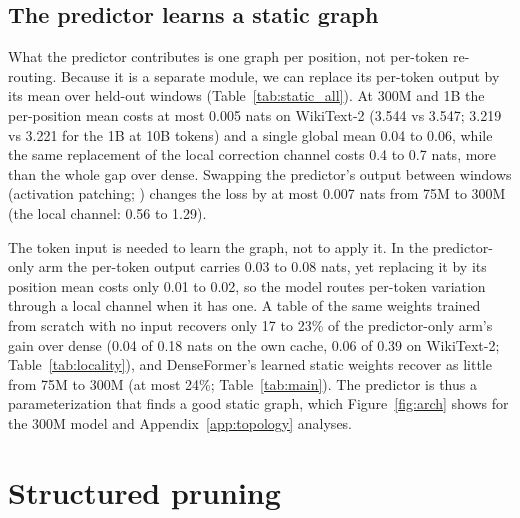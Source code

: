 \documentclass[11pt]{article}
\newcommand{\pend}{\textcolor{black!45}{\textit{run.}}}
\begin{document}
\subsection{The predictor learns a static graph}
\label{sec:static}

What the predictor contributes is one graph per position, not per-token re-routing. Because it is a separate module, we can replace its per-token output by its mean over held-out windows (Table~\ref{tab:static_all}). At 300M and 1B the per-position mean costs at most 0.005 nats on WikiText-2 (3.544 vs 3.547; 3.219 vs 3.221 for the 1B at 10B tokens) and a single global mean 0.04 to 0.06, while the same replacement of the local correction channel costs 0.4 to 0.7 nats, more than the whole gap over dense. Swapping the predictor's output between windows (activation patching; \citealp{vig2020causal,meng2022rome,zhang2024patching}) changes the loss by at most 0.007 nats from 75M to 300M (the local channel: 0.56 to 1.29).

The token input is needed to learn the graph, not to apply it. In the predictor-only arm the per-token output carries 0.03 to 0.08 nats, yet replacing it by its position mean costs only 0.01 to 0.02, so the model routes per-token variation through a local channel when it has one. A table of the same weights trained from scratch with no input recovers only 17 to 23\% of the predictor-only arm's gain over dense (0.04 of 0.18 nats on the own cache, 0.06 of 0.39 on WikiText-2; Table~\ref{tab:locality}), and DenseFormer's learned static weights recover as little from 75M to 300M (at most 24\%; Table~\ref{tab:main}). The predictor is thus a parameterization that finds a good static graph, which Figure~\ref{fig:arch} shows for the 300M model and Appendix~\ref{app:topology} analyses.



\section{Structured pruning}
\label{sec:pruning}

\begin{table}[t]
\centering\small
\setlength{\tabcolsep}{2pt}

\caption{Pruning during domain finetuning on MathInstruct, every model of Table~\ref{tab:main} from its own checkpoint (75M and 150M: 12B' corpus; 300M: 21B corpus): held-out NLL of the unpruned finetune (0\%) and the loss increase relative to it with 50\% and 70\% of attention heads and MLP channels removed by Taylor importance. Bold: best per column. \pend{}: running. All sparsities and the frozen-router controls are in Table~\ref{tab:pruning_full}.}
\label{tab:pruning}
\end{table}
\end{document}
